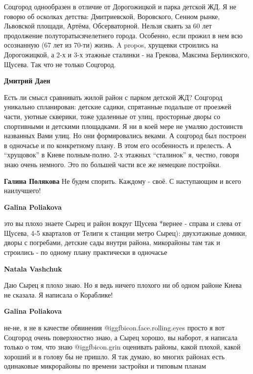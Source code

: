 \begin{itemize}

Соцгород однообразен в отличие от Дорогожицкой и парка детской ЖД. Я не говорю
об осколках детства: Дмитриевской, Воровского, Сенном рынке, Львовской площади,
Артёма, Обсерваторной. Нельзя сваять за 60 лет продолжение
полуторатысячелетнего города. Особенно, если прожил в нем всю осознанную (67
лет из 70-ти) жизнь. A propos, хрущевки строились на Дорогожицкой, а 2-х и 3-х
этажные сталинки - на Грекова, Максима Берлинского, Щусева. Так что не только
Соцгород.

\begin{itemize} %
\textbf{Дмитрий Даен} 

Есть ли смысл сравнивать жилой район с парком детской ЖД? Соцгород уникально
спланирован: детские садики, спрятанные подальше от проезжей части, уютные
скверики, тоже удаленные от улиц, просторные дворы со спортивными и детскими
площадками. Я ни в коей мере не умаляю достоинств названных Вами улиц. Но они
формировались веками. А соцгород был построен в одночасье и по конкретному
плану. В этом его особенность и прелесть. А \enquote{хрущовок} в Киеве полным-полно.
2-х этажных \enquote{сталинок} я, честно, говоря знаю очень немного. Это по большей
части все же немецкие постройки.

\begin{itemize} %
\textbf{Галина Полякова} Не будем спорить. Каждому - своё. С наступающим и всего наилучшего!

\textbf{Galina Poliakova} 

это вы плохо знаете Сырец и район вокруг Щусева *вернее - справа и слева от
Щусева, 4-5 кварталов от Телиги к станции метро Сырец): двухэтажные домики,
дворы с погребами, детские сады внутри района, микорайоны там так и строились -
по одному плану практически в одночасье

\textbf{Natala Vashchuk} 

Даю Сырец я плохо знаю. Но я ведь ничего плохого ни об одном районе Киева не
сказала. Я написала о Кораблике!

\textbf{Galina Poliakova} 

не-не, я не в качестве обвинения  @igg{fbicon.face.rolling.eyes}  просто я вот Соцгород очень поверхностно
знаю, а Сырец хорошо, вы наборот, я написала только о том, что знаю @igg{fbicon.grin}  оценивать
районы, какой плохой, какой хороший и в голову бы не пришло. Я так думаю, во
многих районах есть одинаковые микрорайоны по времени застройки и типовым
планам


\end{itemize}
\end{itemize}
\end{itemize}
